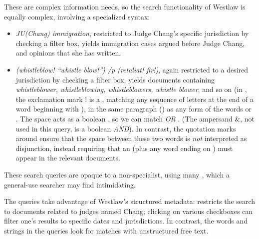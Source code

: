 These are complex information needs, so the search functionality of Westlaw is equally complex, involving a specialized syntax:

\begin{itemize}

\item \emph{JU(Chang) immigration}, restricted to Judge Chang's specific jurisdiction by checking a filter box, yields immigration cases argued before Judge Chang, and opinions that she has written.

\item \emph{(whistleblow! ``whistle blow!'') /p (retaliat! fir!)}, again restricted to a desired jurisdiction by checking a filter box, yields documents containing \emph{whistleblower, whistleblowing, whistleblowers, whistle blower}, and so on (in , the exclamation mark ! is a , matching any sequence of letters at the end of a word beginning with  ), in the same paragraph () as any form of the words  or .  The space acts as a boolean , so we can match  \emph{OR} .  (The ampersand \&, not used in this query, is a boolean \emph{AND}).  In contrast, the quotation marks around  ensure that the space between these two words is \emph{not} interpreted as disjunction, instead requiring that an  (plus any word ending on ) must appear in the relevant documents.

\end{itemize}

These search queries are opaque to a non-specialist, using many , which a general-use searcher may find intimidating.  

The queries take advantage of Westlaw's structured metadata:  restricts the search to documents related to judges named Chang; clicking on various checkboxes can filter one's results to specific dates and jurisdictions.  In contrast, the words and strings in the queries look for matches with unstructured free text.

